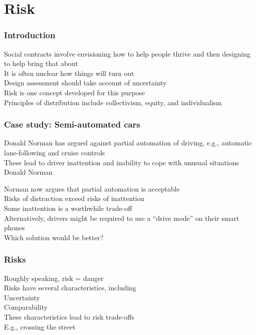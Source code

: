 \documentclass{article}
\begin{document}
\section*{Risk}
\label{sec:risk}
\subsubsection*{Introduction}
\label{ssub:introduction}


Social contracts involve envisioning how to help people thrive and then designing to help bring that about\\
It is often unclear how things will turn out\\
Design assessment should take account of uncertainty\\
Risk is one concept developed for this purpose\\
Principles of distribution include collectivism, equity, and individualism\\
\subsubsection*{Case study: Semi-automated cars}
\label{ssub:case_study_semi_automated_cars}


Donald Norman has argued against partial automation of driving, e.g., automatic lane-following and cruise controls\\
These lead to driver inattention and inability to cope with unusual situations\\
{Donald Norman}


Norman now argues that partial automation is acceptable\\
Risks of distraction exceed risks of inattention\\
Some inattention is a worthwhile trade-off\\
Alternatively, drivers might be required to use a “drive mode” on their smart phones\\
Which solution would be better?\\
\subsubsection*{Risks}
\label{ssub:risks}


Roughly speaking, risk = danger\\
Risks have several characteristics, including\\
Uncertainty\\
Comparability\\
These characteristics lead to risk trade-offs\\
E.g., crossing the street\\
\end{document}
